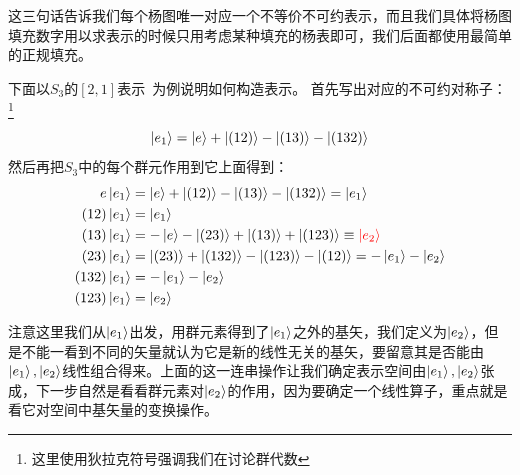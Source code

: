 这三句话告诉我们每个杨图唯一对应一个不等价不可约表示，而且我们具体将杨图填充数字用以求表示的时候只用考虑某种填充的杨表即可，我们后面都使用最简单的正规填充。

下面以$S_3$的$[2,1]$表示{\ }为例说明如何构造表示。
首先写出对应的不可约对称子：\footnote{这里使用狄拉克符号强调我们在讨论群代数}
\begin{equation}
	\ket{e_1}=\ket{e}+\ket{(12)}-\ket{(13)}-\ket{(132)}
\end{equation}
然后再把$S_3$中的每个群元作用到它上面得到：
\begin{equation}
	\begin{aligned}
		e\ket{e_1}&=\ket{e}+\ket{(12)}-\ket{(13)}-\ket{(132)}=\ket{e_1}\\
		(12)\ket{e_1}&=\ket{e_1}\\
		(13)\ket{e_1}&=-\ket{e}-\ket{(23)}+\ket{(13)}+\ket{(123)}\equiv{\color{red}\ket{e_2}}\\
		(23)\ket{e_1}&=\ket{(23)}+\ket{(132)}-\ket{(123)}-\ket{(12)}=-\ket{e_1}-\ket{e_2}\\
		(132)\ket{e_1}&=-\ket{e_1}-\ket{e_2}\\
		(123)\ket{e_1}&=\ket{e_2}
	\end{aligned}
\end{equation}

注意这里我们从$\ket{e_1}$出发，用群元素得到了$\ket{e_1}$之外的基矢，我们定义为$\ket{e_2}$，但是不能一看到不同的矢量就认为它是新的线性无关的基矢，要留意其是否能由$\ket{e_1},\ket{e_2}$线性组合得来。上面的这一连串操作让我们确定表示空间由$\ket{e_1},\ket{e_2}$张成，下一步自然是看看群元素对$\ket{e_2}$的作用，因为要确定一个线性算子，重点就是看它对空间中基矢量的变换操作。

